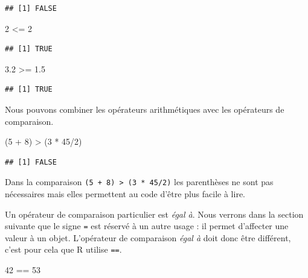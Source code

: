 \documentclass[twoside,symmetric]{book}
\newenvironment{Shaded}{}{}
\newcommand{\DecValTok}[1]{#1}
\newcommand{\FloatTok}[1]{#1}
\newcommand{\NormalTok}[1]{#1}
\newcommand{\OperatorTok}[1]{#1}
\newcommand{\StringTok}[1]{#1}
\begin{document}
\begin{verbatim}
## [1] FALSE
\end{verbatim}

\begin{Shaded}
\begin{Highlighting}[]
\DecValTok{2} \OperatorTok{<=}\StringTok{ }\DecValTok{2}
\end{Highlighting}
\end{Shaded}

\begin{verbatim}
## [1] TRUE
\end{verbatim}

\begin{Shaded}
\begin{Highlighting}[]
\FloatTok{3.2} \OperatorTok{>=}\StringTok{ }\FloatTok{1.5}
\end{Highlighting}
\end{Shaded}

\begin{verbatim}
## [1] TRUE
\end{verbatim}

Nous pouvons combiner les opérateurs arithmétiques avec les opérateurs de comparaison.

\begin{Shaded}
\begin{Highlighting}[]
\NormalTok{(}\DecValTok{5} \OperatorTok{+}\StringTok{ }\DecValTok{8}\NormalTok{) }\OperatorTok{>}\StringTok{ }\NormalTok{(}\DecValTok{3} \OperatorTok{*}\StringTok{ }\DecValTok{45}\OperatorTok{/}\DecValTok{2}\NormalTok{) }
\end{Highlighting}
\end{Shaded}

\begin{verbatim}
## [1] FALSE
\end{verbatim}

Dans la comparaison \texttt{(5\ +\ 8)\ \textgreater{}\ (3\ *\ 45/2)} les parenthèses ne sont pas nécessaires mais elles permettent au code d'être plus facile à lire.

Un opérateur de comparaison particulier est \emph{égal à}. Nous verrons dans la section suivante que le signe \texttt{=} est réservé à un autre usage : il permet d'affecter une valeur à un objet. L'opérateur de comparaison \emph{égal à} doit donc être différent, c'est pour cela que R utilise \texttt{==}.

\begin{Shaded}
\begin{Highlighting}[]
\DecValTok{42} \OperatorTok{==}\StringTok{ }\DecValTok{53}
\end{Highlighting}
\end{Shaded}
\end{document}
